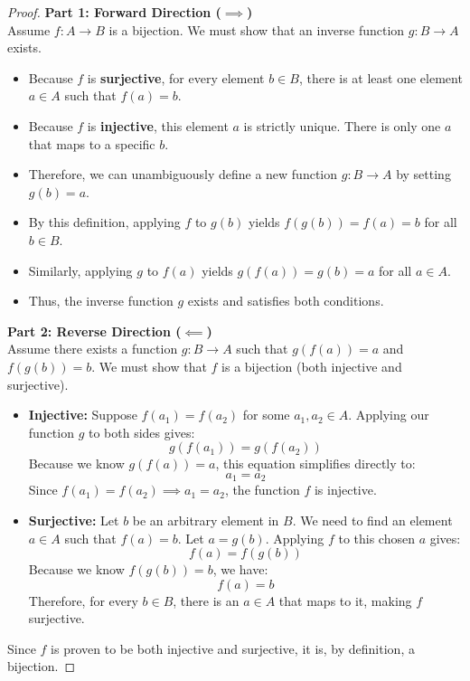 \documentclass{article}
\begin{document}
\begin{proof}
    \textbf{Part 1: Forward Direction ($\implies$)}\\
    Assume $f: A \rightarrow B$ is a bijection. We must show that an inverse function $g: B \rightarrow A$ exists.
    \begin{itemize}
        \item Because $f$ is \textbf{surjective}, for every element $b \in B$, there is at least one element $a \in A$ such that $f(a) = b$.
        \item Because $f$ is \textbf{injective}, this element $a$ is strictly unique. There is only one $a$ that maps to a specific $b$.
        \item Therefore, we can unambiguously define a new function $g: B \rightarrow A$ by setting $g(b) = a$.
        \item By this definition, applying $f$ to $g(b)$ yields $f(g(b)) = f(a) = b$ for all $b \in B$. 
        \item Similarly, applying $g$ to $f(a)$ yields $g(f(a)) = g(b) = a$ for all $a \in A$. 
        \item Thus, the inverse function $g$ exists and satisfies both conditions.
    \end{itemize}

    \vspace{1em} %
    \textbf{Part 2: Reverse Direction ($\impliedby$)}\\
    Assume there exists a function $g: B \rightarrow A$ such that $g(f(a)) = a$ and $f(g(b)) = b$. We must show that $f$ is a bijection (both injective and surjective).
    \begin{itemize}
        \item \textbf{Injective:} Suppose $f(a_1) = f(a_2)$ for some $a_1, a_2 \in A$.
        Applying our function $g$ to both sides gives:
        \[
            g(f(a_1)) = g(f(a_2))
        \]
        Because we know $g(f(a)) = a$, this equation simplifies directly to:
        \[
            a_1 = a_2
        \]
        Since $f(a_1) = f(a_2) \implies a_1 = a_2$, the function $f$ is injective.

        \item \textbf{Surjective:} Let $b$ be an arbitrary element in $B$. We need to find an element $a \in A$ such that $f(a) = b$.
        Let $a = g(b)$.
        Applying $f$ to this chosen $a$ gives:
        \[
            f(a) = f(g(b))
        \]
        Because we know $f(g(b)) = b$, we have:
        \[
            f(a) = b
        \]
        Therefore, for every $b \in B$, there is an $a \in A$ that maps to it, making $f$ surjective.
    \end{itemize}
    
    Since $f$ is proven to be both injective and surjective, it is, by definition, a bijection.
\end{proof}
    
\end{document}
